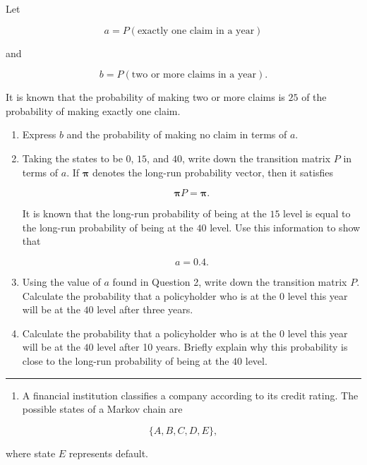 \documentclass[
  letterpaper,
  DIV=11,
  numbers=noendperiod]{scrartcl}
\providecommand{\tightlist}{%
  \setlength{\itemsep}{0pt}\setlength{\parskip}{0pt}}
\begin{document}
Let

\[
a=P(\text{exactly one claim in a year})
\]

and

\[
b=P(\text{two or more claims in a year}).
\]

It is known that the probability of making two or more claims is \(25%
\) of the probability of making exactly one claim.

\begin{enumerate}
\def\labelenumi{\arabic{enumi}.}
\item
  Express \(b\) and the probability of making no claim in terms of
  \(a\).
\item
  Taking the states to be \(0%
  \), \(15%
  \), and \(40%
  \), write down the transition matrix \(P\) in terms of \(a\). If
  \(\boldsymbol{\pi}\) denotes the long-run probability vector, then it
  satisfies

  \[
  \boldsymbol{\pi}P=\boldsymbol{\pi}.
  \]

  It is known that the long-run probability of being at the \(15%
  \) level is equal to the long-run probability of being at the \(40%
  \) level. Use this information to show that

  \[
  a=0.4.
  \]
\item
  Using the value of \(a\) found in Question 2, write down the
  transition matrix \(P\). Calculate the probability that a policyholder
  who is at the \(0%
  \) level this year will be at the \(40%
  \) level after three years.
\item
  Calculate the probability that a policyholder who is at the \(0%
  \) level this year will be at the \(40%
  \) level after 10 years. Briefly explain why this probability is close
  to the long-run probability of being at the \(40%
  \) level.
\end{enumerate}

\begin{center}\rule{0.5\linewidth}{0.5pt}\end{center}

\begin{enumerate}
\def\labelenumi{\arabic{enumi}.}
\setcounter{enumi}{2}
\tightlist
\item
  A financial institution classifies a company according to its credit
  rating. The possible states of a Markov chain are
\end{enumerate}

\[
\{A,B,C,D,E\},
\]

where state \(E\) represents default.
\end{document}
